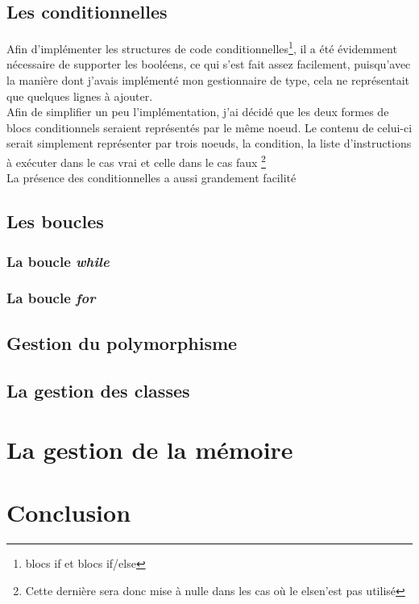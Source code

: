 \documentclass[12pt]{article}
\begin{document}
\subsection{Les conditionnelles}
Afin d'implémenter les structures de code conditionnelles\footnote{blocs if
et blocs if/else}, il a été évidemment nécessaire de supporter les booléens,
ce qui s'est fait assez facilement, puisqu'avec la manière dont j'avais
implémenté mon gestionnaire de type, cela ne représentait que quelques lignes
à ajouter.\\

Afin de simplifier un peu l'implémentation, j'ai décidé que les deux formes
de blocs conditionnels seraient représentés par le même noeud. Le contenu de
celui-ci serait simplement représenter par trois noeuds, la condition, la
liste d'instructions à exécuter dans le cas vrai et celle dans le cas faux
\footnote{Cette dernière sera donc mise à nulle dans les cas où le elsen'est
pas utilisé}\\

La présence des conditionnelles a aussi grandement facilité

\subsection{Les boucles}

\subsubsection{La boucle \em{while}}

\subsubsection{La boucle \em{for}}

\subsection{Gestion du polymorphisme}

\subsection{La gestion des classes}

\section{La gestion de la mémoire}

\section{Conclusion}
\end{document}
